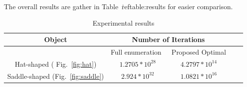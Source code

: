 \documentclass[conference]{IEEEtran}
\begin{document}
The overall results are gather in Table~\.ref{table:results} for easier comparison.
\begin{table}
\centering
\caption{Experimental results}
\begin{tabular}{ | c || c | c | c | c | }
 \hline
  Object  & \multicolumn{2}{|c|}{Number of Iterations} \\
 \hline
  						& Full enumeration~\cite{Yang2020Cellular}  &  Proposed Optimal \\
 \hline
 Hat-shaped ( Fig.~\ref{fig:hat})   	& $1.2705*10^{28}$    				&   $4.2797*10^{14}$\\
 \hline
 Saddle-shaped (Fig.~\ref{fig:saddle})					&   $2.924*10^{32}$  		&   	$1.0821*10^{16}$\\
 \hline
\end{tabular}
\label{table:results}
\end{table}


\end{document}
